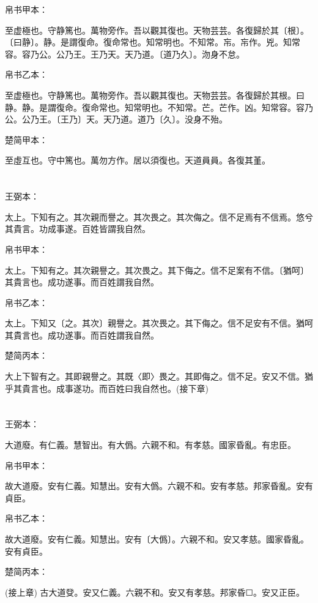 \documentclass[a5paper]{ctexbook}
\begin{document}
    
    帛书甲本：

    至虚極也。守静篤也。萬物旁作。吾以觀其復也。天物芸芸。各復歸於其〔根〕。〔曰静〕。静。是謂復命。復命常也。知常明也。不知常。㠵。㠵作。兇。知常容。容乃公。公乃王。王乃天。天乃道。〔道乃久〕。沕身不怠。

    帛书乙本：

    至虚極也。守静篤也。萬物旁作。吾以觀其復也。天物芸芸。各復歸於其根。曰静。静。是謂復命。復命常也。知常明也。不知常。芒。芒作。凶。知常容。容乃公。公乃王。〔王乃〕天。天乃道。道乃〔久〕。没身不殆。

    楚简甲本：

    至虛互也。守中篤也。萬勿方作。居以須復也。天道員員。各復其堇。

    \chapter{}
    王弼本：

    太上。下知有之。其次親而譽之。其次畏之。其次侮之。信不足焉有不信焉。悠兮其貴言。功成事遂。百姓皆謂我自然。

    
    帛书甲本：

    太上。下知有之。其次親譽之。其次畏之。其下侮之。信不足案有不信。〔猶呵〕其貴言也。成功遂事。而百姓謂我自然。

    帛书乙本：

    太上。下知又〔之。其次〕親譽之。其次畏之。其下侮之。信不足安有不信。猶呵其貴言也。成功遂事。而百姓謂我自然。

    楚简丙本：

    大上下智有之。其即親譽之。其既〈即〉畏之。其即侮之。信不足。安又不信。猶乎其貴言也。成事遂功。而百姓曰我自然也。(接下章)

    \chapter{}
    王弼本：

    大道廢。有仁義。慧智出。有大僞。六親不和。有孝慈。國家昏亂。有忠臣。

    
    帛书甲本：

    故大道廢。安有仁義。知慧出。安有大僞。六親不和。安有孝慈。邦家昏亂。安有貞臣。

    帛书乙本：

    故大道廢。安有仁義。知慧出。安有〔大僞〕。六親不和。安又孝慈。國家昏亂。安有貞臣。

    楚简丙本：

    (接上章) 古大道癹。安又仁義。六親不和。安又有孝慈。邦家昏☐。安又正臣。
\end{document}
